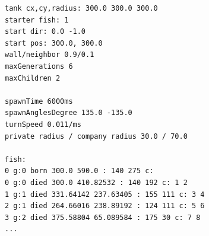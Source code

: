 \documentclass{scrartcl}
\begin{document}
\begin{minipage}[t]{\textwidth}
\scriptsize
\begin{verbatim}
tank cx,cy,radius: 300.0 300.0 300.0
starter fish: 1
start dir: 0.0 -1.0
start pos: 300.0, 300.0
wall/neighbor 0.9/0.1
maxGenerations 6
maxChildren 2

spawnTime 6000ms
spawnAnglesDegree 135.0 -135.0
turnSpeed 0.011/ms
private radius / company radius 30.0 / 70.0

fish:
0 g:0 born 300.0 590.0 : 140 275 c: 
0 g:0 died 300.0 410.82532 : 140 192 c: 1 2 
1 g:1 died 331.64142 237.63405 : 155 111 c: 3 4 
2 g:1 died 264.66016 238.89192 : 124 111 c: 5 6 
3 g:2 died 375.58804 65.089584 : 175 30 c: 7 8 
...
\end{verbatim}
\end{minipage}
\vspace{0.5cm}
\end{document}
